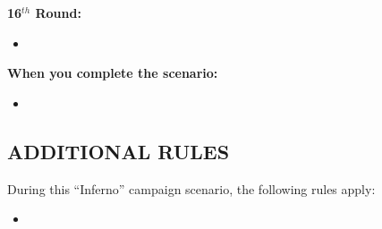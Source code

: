 \begin{multicols*}{2}
\textbf{16$^{th}$ Round:}
\begin{itemize}
  \item 
\end{itemize}

\textbf{When you complete the scenario:}
\begin{itemize}
  \item 
\end{itemize}

\subsection*{\MakeUppercase{Additional rules}}

During this ``Inferno'' campaign scenario, the following rules apply:

\begin{itemize}
    \item 
\end{itemize}

\end{multicols*}

